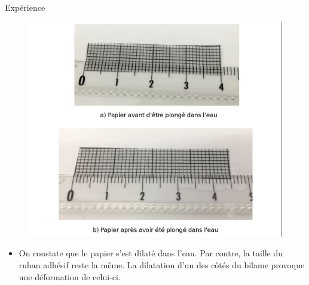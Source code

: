 \begin{frame}{Expérience}
    \begin{figure}
        \centering
        \includegraphics[scale=0.3]{imgs/exp3.JPG}
    \end{figure}
    \begin{itemize}
        \item On constate que le papier s'est dilaté dans l'eau. Par contre, la taille du ruban adhésif reste la même. La dilatation d'un des côtés du bilame provoque une déformation de celui-ci.
    \end{itemize}
    
\end{frame}
